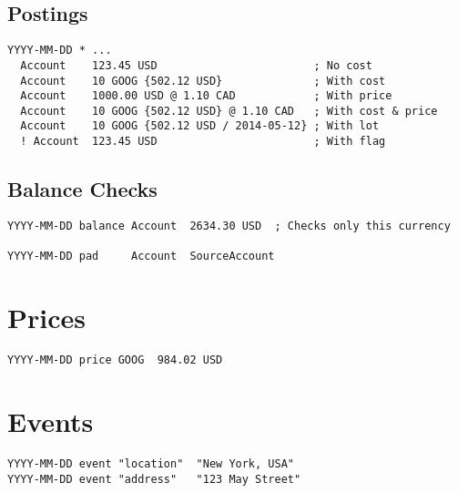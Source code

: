 \documentclass[10pt,landscape]{article}
\begin{document}
\begin{multicols}{2}
\subsection{Postings}
\begin{verbatim}
YYYY-MM-DD * ...
  Account    123.45 USD                        ; No cost
  Account    10 GOOG {502.12 USD}              ; With cost
  Account    1000.00 USD @ 1.10 CAD            ; With price
  Account    10 GOOG {502.12 USD} @ 1.10 CAD   ; With cost & price
  Account    10 GOOG {502.12 USD / 2014-05-12} ; With lot
  ! Account  123.45 USD                        ; With flag
\end{verbatim}

\subsection{Balance Checks}
\begin{verbatim}
YYYY-MM-DD balance Account  2634.30 USD  ; Checks only this currency

YYYY-MM-DD pad     Account  SourceAccount
\end{verbatim}



\columnbreak

\section{Prices}
\begin{verbatim}
YYYY-MM-DD price GOOG  984.02 USD
\end{verbatim}



\section{Events}
\begin{verbatim}
YYYY-MM-DD event "location"  "New York, USA"
YYYY-MM-DD event "address"   "123 May Street"
\end{verbatim}




\end{multicols}
\end{document}
